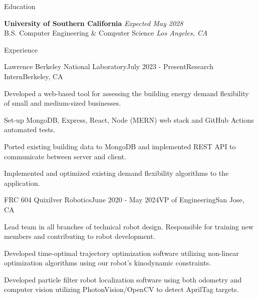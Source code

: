 \documentclass[
	11pt, %
]{tex/resume} %
\begin{document}

\begin{rSection}{Education}
	
	\textbf{University of Southern California} \hfill \textit{Expected May 2028} \\ 
	B.S. Computer Engineering \& Computer Science \hfill \textit{Los Angeles, CA}
	
\end{rSection}


\begin{rSection}{Experience}

	\begin{rSubsection}{Lawrence Berkeley National Laboratory}{July 2023 - Present}{Research Intern}{Berkeley, CA}
		\item Developed a web-based tool for assessing the building energy demand flexibility of small and medium-sized businesses.
		\item Set-up MongoDB, Express, React, Node (MERN) web stack and GitHub Actions automated tests.
        \item Ported existing building data to MongoDB and implemented REST API to communicate between server and client.
        \item Implemented and optimized existing demand flexibility algorithms to the application.
        
	\end{rSubsection}


	\begin{rSubsection}{FRC 604 Quixilver Robotics}{June 2020 - May 2024}{VP of Engineering}{San Jose, CA}
		\item Lead team in all branches of technical robot design. Responsible for training new members and contributing to robot development.
        \item Developed time-optimal trajectory optimization software utilizing non-linear optimization algorithms using our robot’s kinodynamic constraints.
        \item Developed particle filter robot localization software using both odometry and computer vision utilizing PhotonVision/OpenCV to detect AprilTag targets.
        
	\end{rSubsection}





\end{rSection}
\end{document}
